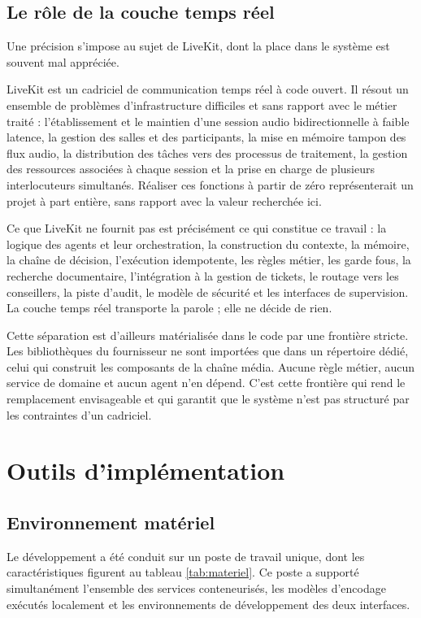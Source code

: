 \subsection{Le rôle de la couche temps réel}

Une précision s'impose au sujet de LiveKit, dont la place dans le système est souvent mal appréciée.

LiveKit est un cadriciel de communication temps réel à code ouvert. Il résout un ensemble de problèmes d'infrastructure difficiles et sans rapport avec le métier traité : l'établissement et le maintien d'une session audio bidirectionnelle à faible latence, la gestion des salles et des participants, la mise en mémoire tampon des flux audio, la distribution des tâches vers des processus de traitement, la gestion des ressources associées à chaque session et la prise en charge de plusieurs interlocuteurs simultanés. Réaliser ces fonctions à partir de zéro représenterait un projet à part entière, sans rapport avec la valeur recherchée ici.

Ce que LiveKit ne fournit pas est précisément ce qui constitue ce travail : la logique des agents et leur orchestration, la construction du contexte, la mémoire, la chaîne de décision, l'exécution idempotente, les règles métier, les garde fous, la recherche documentaire, l'intégration à la gestion de tickets, le routage vers les conseillers, la piste d'audit, le modèle de sécurité et les interfaces de supervision. La couche temps réel transporte la parole ; elle ne décide de rien.

Cette séparation est d'ailleurs matérialisée dans le code par une frontière stricte. Les bibliothèques du fournisseur ne sont importées que dans un répertoire dédié, celui qui construit les composants de la chaîne média. Aucune règle métier, aucun service de domaine et aucun agent n'en dépend. C'est cette frontière qui rend le remplacement envisageable et qui garantit que le système n'est pas structuré par les contraintes d'un cadriciel.

\section{Outils d'implémentation}

\subsection{Environnement matériel}

Le développement a été conduit sur un poste de travail unique, dont les caractéristiques figurent au tableau \ref{tab:materiel}. Ce poste a supporté simultanément l'ensemble des services conteneurisés, les modèles d'encodage exécutés localement et les environnements de développement des deux interfaces.

